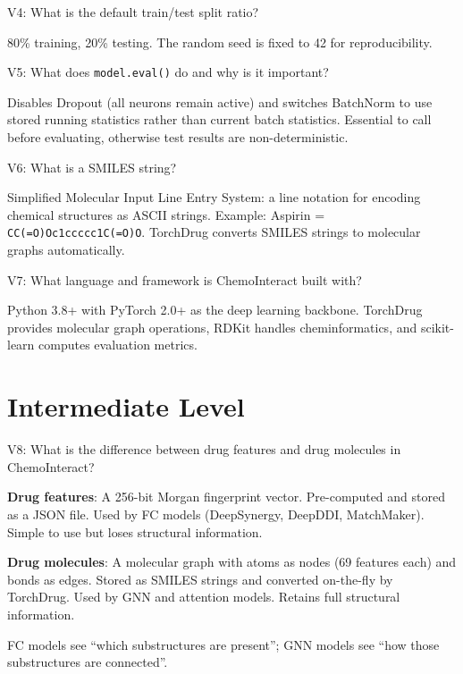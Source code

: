 \documentclass[12pt,a4paper,oneside]{book}
\begin{document}
\begin{tcolorbox}[vivabox]
V4: What is the default train/test split ratio?
\end{tcolorbox}
80\% training, 20\% testing. The random seed is fixed to 42 for reproducibility.

\begin{tcolorbox}[vivabox]
V5: What does \texttt{model.eval()} do and why is it important?
\end{tcolorbox}
Disables Dropout (all neurons remain active) and switches BatchNorm to use stored running statistics rather than current batch statistics. Essential to call before evaluating, otherwise test results are non-deterministic.

\begin{tcolorbox}[vivabox]
V6: What is a SMILES string?
\end{tcolorbox}
Simplified Molecular Input Line Entry System: a line notation for encoding chemical structures as ASCII strings. Example: Aspirin = \texttt{CC(=O)Oc1ccccc1C(=O)O}. TorchDrug converts SMILES strings to molecular graphs automatically.

\begin{tcolorbox}[vivabox]
V7: What language and framework is ChemoInteract built with?
\end{tcolorbox}
Python 3.8+ with PyTorch 2.0+ as the deep learning backbone. TorchDrug provides molecular graph operations, RDKit handles cheminformatics, and scikit-learn computes evaluation metrics.

\section{Intermediate Level}

\begin{tcolorbox}[vivabox]
V8: What is the difference between drug features and drug molecules in ChemoInteract?
\end{tcolorbox}
\textbf{Drug features}: A 256-bit Morgan fingerprint vector. Pre-computed and stored as a JSON file. Used by FC models (DeepSynergy, DeepDDI, MatchMaker). Simple to use but loses structural information.

\textbf{Drug molecules}: A molecular graph with atoms as nodes (69 features each) and bonds as edges. Stored as SMILES strings and converted on-the-fly by TorchDrug. Used by GNN and attention models. Retains full structural information.

FC models see ``which substructures are present''; GNN models see ``how those substructures are connected''.
\end{document}
